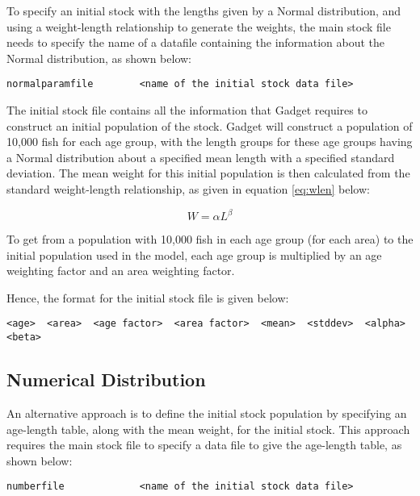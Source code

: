 \documentclass[]{book}
\begin{document}
To specify an initial stock with the lengths given by a Normal
distribution, and using a weight-length relationship to generate the
weights, the main stock file needs to specify the name of a datafile
containing the information about the Normal distribution, as shown
below:

\begin{verbatim}
normalparamfile        <name of the initial stock data file>
\end{verbatim}

The initial stock file contains all the information that Gadget requires
to construct an initial population of the stock. Gadget will construct a
population of 10,000 fish for each age group, with the length groups for
these age groups having a Normal distribution about a specified mean
length with a specified standard deviation. The mean weight for this
initial population is then calculated from the standard weight-length
relationship, as given in
equation \eqref{eq:wlen} below:

\begin{equation}
\label{eq:wlen}
W = \alpha L^{\beta}\end{equation}

To get from a population with 10,000 fish in each age group (for each
area) to the initial population used in the model, each age group is
multiplied by an age weighting factor and an area weighting factor.

Hence, the format for the initial stock file is given below:

\begin{verbatim}
<age>  <area>  <age factor>  <area factor>  <mean>  <stddev>  <alpha>  <beta>
\end{verbatim}

\hypertarget{numerical-distribution}{%
\subsection{Numerical Distribution}\label{numerical-distribution}}

An alternative approach is to define the initial stock population by
specifying an age-length table, along with the mean weight, for the
initial stock. This approach requires the main stock file to specify a
data file to give the age-length table, as shown below:

\begin{verbatim}
numberfile             <name of the initial stock data file>
\end{verbatim}
\end{document}
